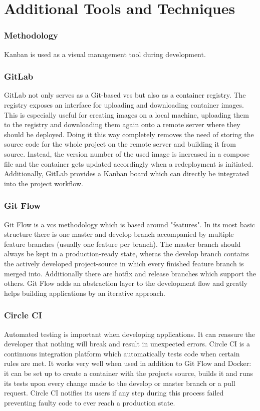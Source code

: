 \section{Additional Tools and Techniques}
\subsubsection{Methodology}
Kanban is used as a visual management tool during development. 

\subsubsection{GitLab}
GitLab not only serves as a Git-based \acrfull{vcs} but also as a container registry. The registry exposes an interface for uploading and downloading container images. This is especially useful for creating images on a local machine, uploading them to the registry and downloading them again onto a remote server where they should be deployed. Doing it this way completely removes the need of storing the source code for the whole project on the remote server and building it from source. Instead, the version number of the used image is increased in a compose file and the container gets updated accordingly when a redeployment is initiated. Additionally, GitLab provides a Kanban board which can directly be integrated into the project workflow.

\subsubsection{Git Flow}
Git Flow is a \acrshort{vcs} methodology which is based around "features". In its most basic structure there is one master and develop branch accompanied by multiple feature branches (usually one feature per branch). The master branch should always be kept in a production-ready state, wheras the develop branch contains the actively developed project-source in which every finished feature branch is merged into. Additionally there are hotfix and release branches which support the others. Git Flow adds an abstraction layer to the development flow and greatly helps building applications by an iterative approach.

\subsubsection{Circle CI}
Automated testing is important when developing applications. It can reassure the developer that nothing will break and result in unexpected errors. Circle CI is a continuous integration platform which automatically tests code when certain rules are met. It works very well when used in addition to Git Flow and Docker: it can be set up to create a container with the projects source, builds it and runs its tests upon every change made to the develop or master branch or a pull request. Circle CI notifies its users if any step during this process failed preventing faulty code to ever reach a production state.

